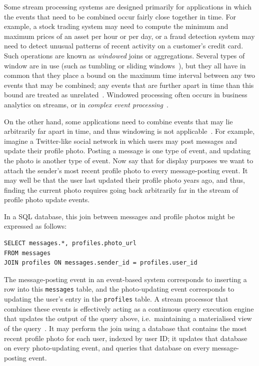 \documentclass[sigconf]{acmart}
\begin{document}
Some stream processing systems are designed primarily for applications in which the events that need to be combined occur fairly close together in time.
For example, a stock trading system may need to compute the minimum and maximum prices of an asset per hour or per day, or a fraud detection system may need to detect unusual patterns of recent activity on a customer's credit card.
Such operations are known as \emph{windowed} joins or aggregations.
Several types of window are in use (such as tumbling or sliding windows~\cite{Akidau:2015}), but they all have in common that they place a bound on the maximum time interval between any two events that may be combined; any events that are further apart in time than this bound are treated as unrelated~\cite{Akidau:2018}.
Windowed processing often occurs in business analytics on streams, or in \emph{complex event processing}~\cite{Luckham:2002}.

On the other hand, some applications need to combine events that may lie arbitrarily far apart in time, and thus windowing is not applicable~\cite{Chirkova:2012}.
For example, imagine a Twitter-like social network in which users may post messages and update their profile photo.
Posting a message is one type of event, and updating the photo is another type of event.
Now say that for display purposes we want to attach the sender's most recent profile photo to every message-posting event.
It may well be that the user last updated their profile photo years ago, and thus, finding the current photo requires going back arbitrarily far in the stream of profile photo update events.

In a SQL database, this join between messages and profile photos might be expressed as follows:

\begin{verbatim}
SELECT messages.*, profiles.photo_url
FROM messages
JOIN profiles ON messages.sender_id = profiles.user_id
\end{verbatim}

The message-posting event in an event-based system corresponds to inserting a row into this \texttt{messages} table, and the photo-updating event corresponds to updating the user's entry in the \texttt{profiles} table.
A stream processor that combines these events is effectively acting as a continuous query execution engine that updates the output of the query above, i.e.\ maintaining a materialised view of the query~\cite{Chirkova:2012}.
It may perform the join using a database that contains the most recent profile photo for each user, indexed by user ID; it updates that database on every photo-updating event, and queries that database on every message-posting event.
\end{document}
